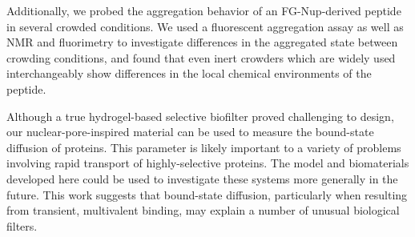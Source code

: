 Additionally, we probed the aggregation behavior of an FG-Nup-derived peptide in several crowded conditions.  We used a fluorescent aggregation assay as well as NMR and fluorimetry to investigate differences in the aggregated state between crowding conditions, and found that even inert crowders which are widely used interchangeably show differences in the local chemical environments of the peptide.

Although a true hydrogel-based selective biofilter proved challenging to design, our nuclear-pore-inspired material can be used to measure the bound-state diffusion of proteins.  This parameter is likely important to a variety of problems involving rapid transport of highly-selective proteins.  The model and biomaterials developed here could be used to investigate these systems more generally in the future.  This work suggests that bound-state diffusion, particularly when resulting from transient, multivalent binding, may explain a number of unusual biological filters.

